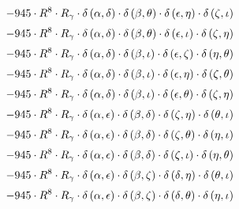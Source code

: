 \begin{subequations}
\begin{gather}
 \\[0.2em] \notag 		 - 945 \cdot R^{8} \cdot R_{\gamma{}} \cdot \delta{}\left(\alpha{}, \delta{}\right) \cdot \delta{}\left(\beta{}, \theta{}\right) \cdot \delta{}\left(\epsilon{}, \eta{}\right) \cdot \delta{}\left(\zeta{}, \iota{}\right) 
 \\[0.2em] \notag 		 - 945 \cdot R^{8} \cdot R_{\gamma{}} \cdot \delta{}\left(\alpha{}, \delta{}\right) \cdot \delta{}\left(\beta{}, \theta{}\right) \cdot \delta{}\left(\epsilon{}, \iota{}\right) \cdot \delta{}\left(\zeta{}, \eta{}\right) 
 \\[0.2em] \notag 		 - 945 \cdot R^{8} \cdot R_{\gamma{}} \cdot \delta{}\left(\alpha{}, \delta{}\right) \cdot \delta{}\left(\beta{}, \iota{}\right) \cdot \delta{}\left(\epsilon{}, \zeta{}\right) \cdot \delta{}\left(\eta{}, \theta{}\right) 
 \\[0.2em] \notag 		 - 945 \cdot R^{8} \cdot R_{\gamma{}} \cdot \delta{}\left(\alpha{}, \delta{}\right) \cdot \delta{}\left(\beta{}, \iota{}\right) \cdot \delta{}\left(\epsilon{}, \eta{}\right) \cdot \delta{}\left(\zeta{}, \theta{}\right) 
 \\[0.2em] \notag 		 - 945 \cdot R^{8} \cdot R_{\gamma{}} \cdot \delta{}\left(\alpha{}, \delta{}\right) \cdot \delta{}\left(\beta{}, \iota{}\right) \cdot \delta{}\left(\epsilon{}, \theta{}\right) \cdot \delta{}\left(\zeta{}, \eta{}\right) 
 \\[0.2em] \notag 		 - 945 \cdot R^{8} \cdot R_{\gamma{}} \cdot \delta{}\left(\alpha{}, \epsilon{}\right) \cdot \delta{}\left(\beta{}, \delta{}\right) \cdot \delta{}\left(\zeta{}, \eta{}\right) \cdot \delta{}\left(\theta{}, \iota{}\right) 
 \\[0.2em] \notag 		 - 945 \cdot R^{8} \cdot R_{\gamma{}} \cdot \delta{}\left(\alpha{}, \epsilon{}\right) \cdot \delta{}\left(\beta{}, \delta{}\right) \cdot \delta{}\left(\zeta{}, \theta{}\right) \cdot \delta{}\left(\eta{}, \iota{}\right) 
 \\[0.2em] \notag 		 - 945 \cdot R^{8} \cdot R_{\gamma{}} \cdot \delta{}\left(\alpha{}, \epsilon{}\right) \cdot \delta{}\left(\beta{}, \delta{}\right) \cdot \delta{}\left(\zeta{}, \iota{}\right) \cdot \delta{}\left(\eta{}, \theta{}\right) 
 \\[0.2em] \notag 		 - 945 \cdot R^{8} \cdot R_{\gamma{}} \cdot \delta{}\left(\alpha{}, \epsilon{}\right) \cdot \delta{}\left(\beta{}, \zeta{}\right) \cdot \delta{}\left(\delta{}, \eta{}\right) \cdot \delta{}\left(\theta{}, \iota{}\right) 
 \\[0.2em] \notag 		 - 945 \cdot R^{8} \cdot R_{\gamma{}} \cdot \delta{}\left(\alpha{}, \epsilon{}\right) \cdot \delta{}\left(\beta{}, \zeta{}\right) \cdot \delta{}\left(\delta{}, \theta{}\right) \cdot \delta{}\left(\eta{}, \iota{}\right) 

\end{gather}
\end{subequations}

